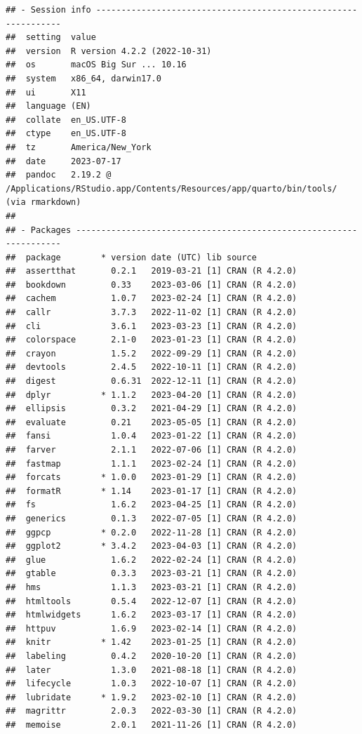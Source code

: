 \documentclass[print]{nuthesis}
\begin{document}
\begin{verbatim}
## - Session info ---------------------------------------------------------------
##  setting  value
##  version  R version 4.2.2 (2022-10-31)
##  os       macOS Big Sur ... 10.16
##  system   x86_64, darwin17.0
##  ui       X11
##  language (EN)
##  collate  en_US.UTF-8
##  ctype    en_US.UTF-8
##  tz       America/New_York
##  date     2023-07-17
##  pandoc   2.19.2 @ /Applications/RStudio.app/Contents/Resources/app/quarto/bin/tools/ (via rmarkdown)
## 
## - Packages -------------------------------------------------------------------
##  package        * version date (UTC) lib source
##  assertthat       0.2.1   2019-03-21 [1] CRAN (R 4.2.0)
##  bookdown         0.33    2023-03-06 [1] CRAN (R 4.2.0)
##  cachem           1.0.7   2023-02-24 [1] CRAN (R 4.2.0)
##  callr            3.7.3   2022-11-02 [1] CRAN (R 4.2.0)
##  cli              3.6.1   2023-03-23 [1] CRAN (R 4.2.0)
##  colorspace       2.1-0   2023-01-23 [1] CRAN (R 4.2.0)
##  crayon           1.5.2   2022-09-29 [1] CRAN (R 4.2.0)
##  devtools         2.4.5   2022-10-11 [1] CRAN (R 4.2.0)
##  digest           0.6.31  2022-12-11 [1] CRAN (R 4.2.0)
##  dplyr          * 1.1.2   2023-04-20 [1] CRAN (R 4.2.0)
##  ellipsis         0.3.2   2021-04-29 [1] CRAN (R 4.2.0)
##  evaluate         0.21    2023-05-05 [1] CRAN (R 4.2.0)
##  fansi            1.0.4   2023-01-22 [1] CRAN (R 4.2.0)
##  farver           2.1.1   2022-07-06 [1] CRAN (R 4.2.0)
##  fastmap          1.1.1   2023-02-24 [1] CRAN (R 4.2.0)
##  forcats        * 1.0.0   2023-01-29 [1] CRAN (R 4.2.0)
##  formatR        * 1.14    2023-01-17 [1] CRAN (R 4.2.0)
##  fs               1.6.2   2023-04-25 [1] CRAN (R 4.2.0)
##  generics         0.1.3   2022-07-05 [1] CRAN (R 4.2.0)
##  ggpcp          * 0.2.0   2022-11-28 [1] CRAN (R 4.2.0)
##  ggplot2        * 3.4.2   2023-04-03 [1] CRAN (R 4.2.0)
##  glue             1.6.2   2022-02-24 [1] CRAN (R 4.2.0)
##  gtable           0.3.3   2023-03-21 [1] CRAN (R 4.2.0)
##  hms              1.1.3   2023-03-21 [1] CRAN (R 4.2.0)
##  htmltools        0.5.4   2022-12-07 [1] CRAN (R 4.2.0)
##  htmlwidgets      1.6.2   2023-03-17 [1] CRAN (R 4.2.0)
##  httpuv           1.6.9   2023-02-14 [1] CRAN (R 4.2.0)
##  knitr          * 1.42    2023-01-25 [1] CRAN (R 4.2.0)
##  labeling         0.4.2   2020-10-20 [1] CRAN (R 4.2.0)
##  later            1.3.0   2021-08-18 [1] CRAN (R 4.2.0)
##  lifecycle        1.0.3   2022-10-07 [1] CRAN (R 4.2.0)
##  lubridate      * 1.9.2   2023-02-10 [1] CRAN (R 4.2.0)
##  magrittr         2.0.3   2022-03-30 [1] CRAN (R 4.2.0)
##  memoise          2.0.1   2021-11-26 [1] CRAN (R 4.2.0)

\end{verbatim}
\end{document}
